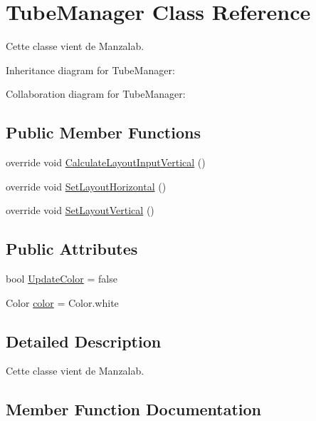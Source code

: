\hypertarget{class_tube_manager}{}\section{Tube\+Manager Class Reference}
\label{class_tube_manager}


Cette classe vient de Manzalab.  




Inheritance diagram for Tube\+Manager\+:


Collaboration diagram for Tube\+Manager\+:
\subsection*{Public Member Functions}
\begin{DoxyCompactItemize}
\item 
override void \hyperlink{class_tube_manager_a2b45a6bc0c29e4447e4a484578784c87}{Calculate\+Layout\+Input\+Vertical} ()
\item 
override void \hyperlink{class_tube_manager_a3a369e137062906ec47a4e1db6cad5e4}{Set\+Layout\+Horizontal} ()
\item 
override void \hyperlink{class_tube_manager_afd4503acb46cbd0e5f717cb0cae13c01}{Set\+Layout\+Vertical} ()
\end{DoxyCompactItemize}
\subsection*{Public Attributes}
\begin{DoxyCompactItemize}
\item 
bool \hyperlink{class_tube_manager_a7b5de091047832cf01250cd3d0faaf87}{Update\+Color} = false
\item 
Color \hyperlink{class_tube_manager_a9a284a4efcadd631df2d3585bf8a6785}{color} = Color.\+white
\end{DoxyCompactItemize}


\subsection{Detailed Description}
Cette classe vient de Manzalab. 



\subsection{Member Function Documentation}
\mbox{\label{class_tube_manager_a2b45a6bc0c29e4447e4a484578784c87}} 
